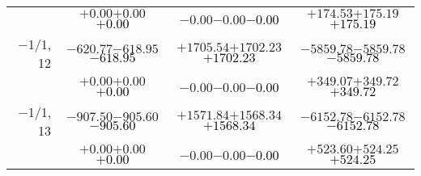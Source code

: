 \documentclass[compress]{beamer}
\begin{document}
\begin{frame}
{\begin{tabular}{r | c | c | c}
           & $+0.00$\hspace{0.1 cm}$+0.00$\hspace{0.1 cm}\textcolor{black}{$+0.00$} & $-0.00$\hspace{0.1 cm}$-0.00$\hspace{0.1 cm}\textcolor{black}{$-0.00$} & $+174.53$\hspace{0.1 cm}$+175.19$\hspace{0.1 cm}\textcolor{black}{$+175.19$} \\
$-$1/1, 12 & $-620.77$\hspace{0.1 cm}$-618.95$\hspace{0.1 cm}\textcolor{black}{$-618.95$} & $+1705.54$\hspace{0.1 cm}$+1702.23$\hspace{0.1 cm}\textcolor{black}{$+1702.23$} & $-5859.78$\hspace{0.1 cm}$-5859.78$\hspace{0.1 cm}\textcolor{black}{$-5859.78$} \\
           & $+0.00$\hspace{0.1 cm}$+0.00$\hspace{0.1 cm}\textcolor{black}{$+0.00$} & $-0.00$\hspace{0.1 cm}$-0.00$\hspace{0.1 cm}\textcolor{black}{$-0.00$} & $+349.07$\hspace{0.1 cm}$+349.72$\hspace{0.1 cm}\textcolor{black}{$+349.72$} \\
$-$1/1, 13 & $-907.50$\hspace{0.1 cm}$-905.60$\hspace{0.1 cm}\textcolor{black}{$-905.60$} & $+1571.84$\hspace{0.1 cm}$+1568.34$\hspace{0.1 cm}\textcolor{black}{$+1568.34$} & $-6152.78$\hspace{0.1 cm}$-6152.78$\hspace{0.1 cm}\textcolor{black}{$-6152.78$} \\
           & $+0.00$\hspace{0.1 cm}$+0.00$\hspace{0.1 cm}\textcolor{black}{$+0.00$} & $-0.00$\hspace{0.1 cm}$-0.00$\hspace{0.1 cm}\textcolor{black}{$-0.00$} & $+523.60$\hspace{0.1 cm}$+524.25$\hspace{0.1 cm}\textcolor{black}{$+524.25$} \\

\end{tabular}}
\end{frame}
\end{document}
